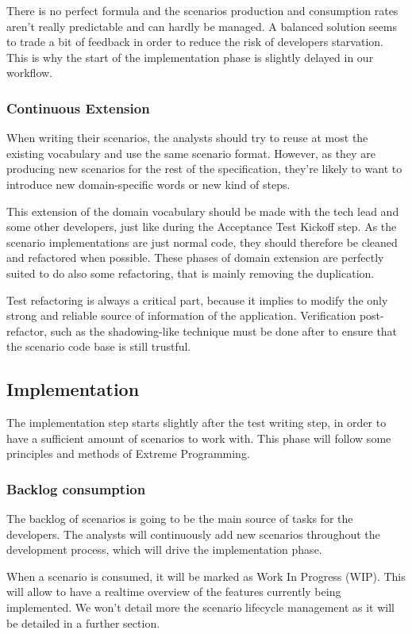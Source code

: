 There is no perfect formula and the scenarios production and consumption
rates aren't really predictable and can hardly be managed.
A balanced solution seems to trade a bit of feedback in order to reduce the
risk of developers starvation.
This is why the start of the implementation phase is slightly delayed in our
workflow.

\subsubsection{Continuous Extension}
When writing their scenarios, the analysts should try to reuse at most the
existing vocabulary and use the same scenario format.
However, as they are producing new scenarios for the rest of the
specification, they're likely to want to introduce new domain-specific words or
new kind of steps.

This extension of the domain vocabulary should be made with the tech lead and
some other developers, just like during the Acceptance Test Kickoff step.
As the scenario implementations are just normal code, they should therefore be
cleaned and refactored when possible.
These phases of domain extension are perfectly suited to do also some
refactoring, that is mainly removing the duplication.

Test refactoring is always a critical part, because it implies to modify the
only strong and reliable source of information of the application.
Verification post-refactor, such as the shadowing-like technique must be done
after to ensure that the scenario code base is still trustful.

\subsection{Implementation}\label{subsec:implementation}
The implementation step starts slightly after the test writing step, in order
to have a sufficient amount of scenarios to work with.
This phase will follow some principles and methods of Extreme Programming.

\subsubsection{Backlog consumption}
The backlog of scenarios is going to be the main source of tasks for the
developers.
The analysts will continuously add new scenarios throughout the
development process, which will drive the implementation phase.

When a scenario is consumed, it will be marked as Work In Progress (WIP).
This will allow to have a realtime overview of the features currently being
implemented.
We won't detail more the scenario lifecycle management as it will be detailed
in a further section.

